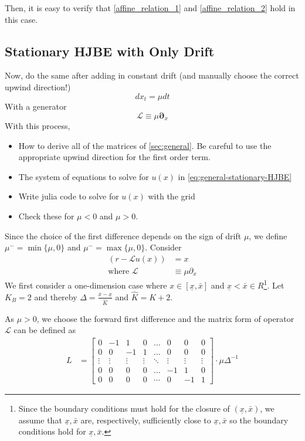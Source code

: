 \documentclass[11pt]{article}
\newcommand{\D}[1][]{\ensuremath{\boldsymbol{\partial}_{#1}}}
\begin{document}
Then, it is easy to verify that \eqref{affine_relation_1} and \eqref{affine_relation_2} hold in this case.

\subsection{Stationary HJBE with Only Drift}
Now, do the same after adding in constant drift (and manually choose the correct upwind direction!)
$$
d x_t = \mu dt
$$
With a generator
$$
	\mathcal{L} \equiv \mu \D[x]
$$
With this process,
\begin{itemize}
	\item How to derive all of the matrices of \cref{sec:general}.  Be careful to use the appropriate upwind direction for the first order term.
	\item The system of equations to solve for $u(x)$ in \cref{eq:general-stationary-HJBE}
	\item Write julia code to solve for $u(x)$ with the grid
	\item Check these for $\mu < 0$ and $\mu > 0$.
\end{itemize}
Since the choice of the first difference depends on the sign of drift $\mu$, we define $\mu^- =\min\{\mu, 0\}$ and $\mu^- =\max\{\mu, 0\}$.
Consider
\begin{align}
(r- \mathcal{L} u(x)) &= x\label{HJBE_PDE_with_drifts}\\
\text{where }\mathcal{L}&\equiv \mu\partial_{x}
\end{align}
We first consider a one-dimension case where $x\in [\underline{\textit{\~{x}}}, \bar{\textit{\~{x}}}]$ and $\underline{\textit{\~{x}}} < \bar{\textit{\~{x}}} \in R$\footnote{Since the boundary conditions must hold for the closure of $(\underline{x},\bar{x})$, we assume that $\underline{\textit{\~{x}}}, \bar{\textit{\~{x}}}$ are, respectively, sufficiently close to $\underline{x}, \bar{x}$ so the boundary conditions hold for $\underline{\textit{\~{x}}}, \bar{\textit{\~{x}}}$.}. Let $K_B = 2$ and thereby $\Delta  = \frac{\bar{\textit{\~{x}}} - \underline{\textit{\~{x}}}}{\hat{K}}$ and $\hat{K} = K+2$. 

As $\mu>0$, we choose the forward first difference and the matrix form of operator $\mathcal{L}$ can be defined as
\begin{align}
L &= \begin{bmatrix}
0&-1&1&0&\dots&0&0&0\\
0&0&-1&1&\dots&0&0&0\\
\vdots&\vdots&\vdots&\vdots&\ddots&\vdots&\vdots&\vdots\\
0&0&0&0&\dots&-1&1&0\\
0&0&0&0&\cdots&0&-1&1
\end{bmatrix}\cdot\mu\Delta^{-1}\nonumber
\end{align}
\end{document}
